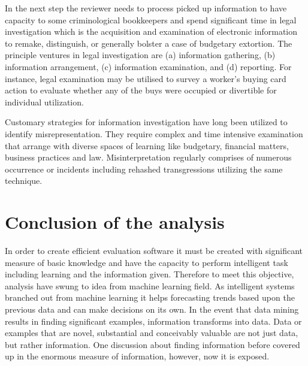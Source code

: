 In the next step the reviewer needs to process picked up information to have capacity to some criminological bookkeepers and spend significant time in legal investigation which is the acquisition and examination of electronic information to remake, distinguish, or generally bolster a case of budgetary extortion. The principle ventures in legal investigation are (a) information gathering, (b) information arrangement, (c) information examination, and (d) reporting. For instance, legal examination may be utilised to survey a worker's buying card action to evaluate whether any of the buys were occupied or divertible for individual utilization. 

Customary strategies for information investigation have long been utilized to identify misrepresentation. They require complex and time intensive examination that arrange with diverse spaces of learning like budgetary, financial matters, business practices and law. Misinterpretation regularly comprises of numerous occurrence or incidents including rehashed transgressions utilizing the same technique.


\section {Conclusion of the analysis}

In order to create efficient evaluation software it must be created with significant measure of basic knowledge and have the capacity to perform intelligent task including learning and the information given. Therefore to meet this objective, analysis have swung to idea from machine learning field. As intelligent systems branched out from machine learning it helps forecasting trends based upon the previous data and can make decisions on its own. In the event that data mining results in finding significant examples, information transforms into data. Data or examples that are novel, substantial and conceivably valuable are not just data, but rather information. One discussion about finding information before covered up in the enormous measure of information, however, now it is exposed. 

%

